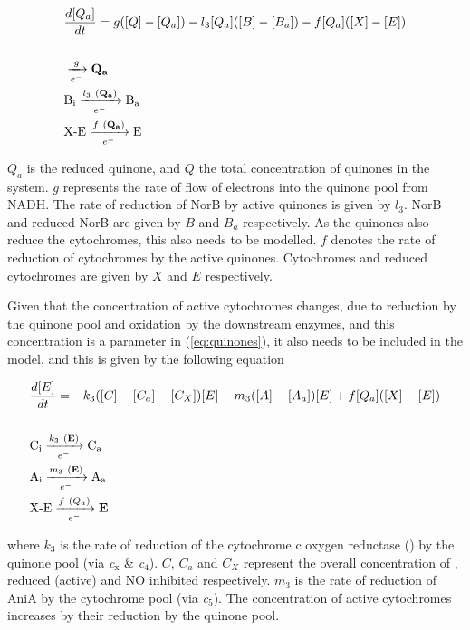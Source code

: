 \begin{eqnarray}
&\frac{d[Q_a]}{dt} = g([Q] - [Q_a]) - l_3[Q_a]([B] - [B_a]) - f[Q_a]([X]-[E]) \nonumber \\\nonumber \\
&\xrightarrow[e^-]{g} \mathbf{Q_a} \nonumber \\
&\textnormal{B$_\textnormal{i}$} \xrightarrow[e^-]{l_3~(\mathbf{Q_a})} \textnormal{B$_\textnormal{a}$} \nonumber \\
&\textnormal{X-E} \xrightarrow[e^-]{f~(\mathbf{Q_a})} \textnormal{E}
\label{eq:quinones}
\end{eqnarray}

$Q_a$ is the reduced quinone, and $Q$ the total concentration of quinones in the system. $g$ represents the rate of flow of electrons into the quinone pool from NADH. The rate of reduction of NorB by active quinones is given by $l_3$. NorB and reduced NorB are given by $B$ and $B_a$ respectively. As the quinones also reduce the cytochromes, this also needs to be modelled. $f$ denotes the rate of reduction of cytochromes by the active quinones. Cytochromes and reduced cytochromes are given by $X$ and $E$ respectively.

Given that the concentration of active cytochromes changes, due to reduction by the quinone pool and oxidation by the downstream enzymes, and this concentration is a parameter in (\ref{eq:quinones}), it also needs to be included in the model, and this is given by the following equation

\begin{eqnarray}
&\frac{d[E]}{dt} = -k_3([C] - [C_a] - [C_X])[E]  - m_3([A] - [A_a])[E] + f[Q_a]([X]-[E]) \nonumber \\\nonumber \\
&\textnormal{C$_\textnormal{i}$} \xrightarrow[e^-]{k_3~(\mathbf{E})} \textnormal{C$_\textnormal{a}$} \nonumber \\
&\textnormal{A$_\textnormal{i}$} \xrightarrow[e^-]{m_3~(\mathbf{E})} \textnormal{A$_\textnormal{a}$} \nonumber \\
&\textnormal{X-E} \xrightarrow[e^-]{f~(Q_a)} \mathbf{E}
\label{eq:cytochromes}
\end{eqnarray}

where $k_3$ is the rate of reduction of the cytochrome c oxygen reductase (\cbbthree{}) by the quinone pool (via \textit{c$_{\textrm{x}}$} \& \textit{c$_{\textrm{4}}$}). $C$, $C_a$ and $C_X$ represent the overall concentration of \cbbthree{}, reduced (active) \cbbthree{} and NO inhibited \cbbthree{} respectively. $m_3$ is the rate of reduction of AniA by the cytochrome pool (via \textit{c$_{\textrm{5}}$}). The concentration of active cytochromes increases by their reduction by the quinone pool.

